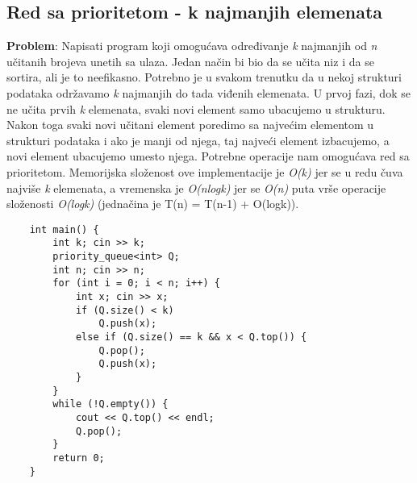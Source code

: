 \documentclass{article}
\begin{document}
\subsection{Red sa prioritetom - k najmanjih elemenata}
\textbf{Problem}: Napisati program koji omogućava određivanje \textit{k} najmanjih od \textit{n}
učitanih brojeva unetih sa ulaza.
\newline Jedan način bi bio da se učita niz i da se sortira, ali je to neefikasno. Potrebno je u svakom trenutku da u nekoj strukturi
podataka održavamo \textit{k} najmanjih do tada viđenih elemenata. U prvoj fazi, dok
se ne učita prvih \textit{k} elemenata, svaki novi element samo ubacujemo u strukturu.
Nakon toga svaki novi učitani element poredimo sa najvećim elementom u
strukturi podataka i ako je manji od njega, taj najveći element izbacujemo, a
novi element ubacujemo umesto njega. Potrebne operacije nam
omogućava red sa prioritetom. Memorijska složenost ove implementacije je \textit{O(k)}
jer se u redu čuva najviše \textit{k} elemenata, a vremenska je \textit{O(nlogk)} jer se \textit{O(n)}
puta vrše operacije složenosti \textit{O(logk)} (jednačina je 
T(n) = T(n-1) + O(logk)).
\begin{lstlisting}
    int main() {
        int k; cin >> k;
        priority_queue<int> Q;
        int n; cin >> n;
        for (int i = 0; i < n; i++) {
            int x; cin >> x;
            if (Q.size() < k)
                Q.push(x);
            else if (Q.size() == k && x < Q.top()) {
                Q.pop();
                Q.push(x);
            }
        }
        while (!Q.empty()) {
            cout << Q.top() << endl;
            Q.pop();
        }
        return 0;
    }
\end{lstlisting}
\end{document}
